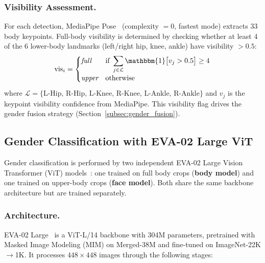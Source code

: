 \documentclass[11pt,a4paper]{article}
\begin{document}
\subsubsection{Visibility Assessment.}
For each detection, MediaPipe Pose~\cite{mediapipe} (complexity $= 0$, fastest mode) extracts 33 body keypoints. Full-body visibility is determined by checking whether at least 4 of the 6 lower-body landmarks (left/right hip, knee, ankle) have visibility $> 0.5$:
\begin{equation}
\text{vis}_i = \begin{cases}
\textit{full} & \text{if } \displaystyle\sum_{j \in \mathcal{L}} \mathbbm{1}\bigl[v_j > 0.5\bigr] \geq 4 \\[4pt]
\textit{upper} & \text{otherwise}
\end{cases}
\label{eq:visibility}
\end{equation}
where $\mathcal{L} = \{\text{L-Hip, R-Hip, L-Knee, R-Knee, L-Ankle, R-Ankle}\}$ and $v_j$ is the keypoint visibility confidence from MediaPipe. This visibility flag drives the gender fusion strategy (Section~\ref{subsec:gender_fusion}).


\subsection{Gender Classification with EVA-02 Large ViT}
\label{subsec:gender}

Gender classification is performed by two independent EVA-02 Large Vision Transformer (ViT) models~\cite{eva02}: one trained on full body crops (\textbf{body model}) and one trained on upper-body crops (\textbf{face model}). Both share the same backbone architecture but are trained separately.

\subsubsection{Architecture.}
EVA-02 Large~\cite{eva02} is a ViT-L/14 backbone with 304M parameters, pretrained with Masked Image Modeling (MIM) on Merged-38M and fine-tuned on ImageNet-22K$\to$1K. It processes $448 \times 448$ images through the following stages:
\end{document}
